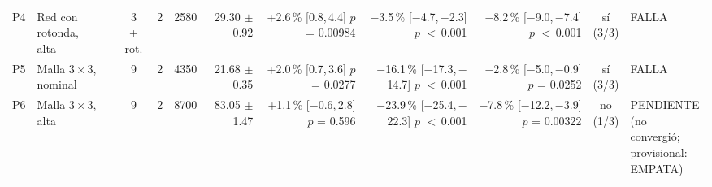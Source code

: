 \begin{table}[H]
\begin{tabular}{llcrrrrrrcl}
P4 & \makecell[l]{Red con\\{}rotonda,\\{}alta} & \makecell[c]{3\\{}+ rot.} & 2 & 2580 & \makecell[r]{29.30\\{}$\pm$ 0.92} & \makecell[r]{+2.6\,\%\\{}[0.8,\,4.4]\\$p$ = 0.00984} & \makecell[r]{$-$3.5\,\%\\{}[$-$4.7,\,$-$2.3]\\$p$ $<$\,0.001} & \makecell[r]{$-$8.2\,\%\\{}[$-$9.0,\,$-$7.4]\\$p$ $<$\,0.001} & \makecell[c]{sí\\{}(3/3)} & FALLA \\
P5 & \makecell[l]{Malla $3 \times 3$,\\{}nominal} & 9 & 2 & 4350 & \makecell[r]{21.68\\{}$\pm$ 0.35} & \makecell[r]{+2.0\,\%\\{}[0.7,\,3.6]\\$p$ = 0.0277} & \makecell[r]{$-$16.1\,\%\\{}[$-$17.3,\,$-$14.7]\\$p$ $<$\,0.001} & \makecell[r]{$-$2.8\,\%\\{}[$-$5.0,\,$-$0.9]\\$p$ = 0.0252} & \makecell[c]{sí\\{}(3/3)} & FALLA \\
P6 & \makecell[l]{Malla $3 \times 3$,\\{}alta} & 9 & 2 & 8700 & \makecell[r]{83.05\\{}$\pm$ 1.47} & \makecell[r]{+1.1\,\%\\{}[$-$0.6,\,2.8]\\$p$ = 0.596} & \makecell[r]{$-$23.9\,\%\\{}[$-$25.4,\,$-$22.3]\\$p$ $<$\,0.001} & \makecell[r]{$-$7.8\,\%\\{}[$-$12.2,\,$-$3.9]\\$p$ = 0.00322} & \makecell[c]{no\\{}(1/3)} & \makecell[l]{PENDIENTE\\{}(no convergió;\\{}provisional:\\{}EMPATA)} \\
\bottomrule
\end{tabular}

\end{table}
